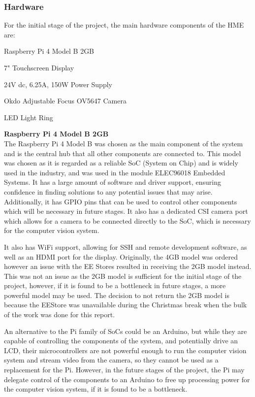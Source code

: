 \subsubsection{Hardware} \label{sec:hardware}
For the initial stage of the project, the main hardware components of the HME are:
\begin{mylist}
  \item Raspberry Pi 4 Model B 2GB\cite{pi4}
  \item 7" Touchscreen Display\cite{7inchdisplay}
  \item 24V dc, 6.25A, 150W Power Supply
  \item Okdo Adjustable Focus OV5647 Camera\cite{okdocamera}
  \item LED Light Ring
\end{mylist}
\textbf{Raspberry Pi 4 Model B 2GB} \\
The Raspberry Pi 4 Model B was chosen as the main component of the system and is the central hub that all other components are connected to.
This model was chosen as it is regarded as a reliable SoC (System on Chip) and is widely used in the industry, and was used in the module ELEC96018 Embedded Systems.
It has a large amount of software and driver support, ensuring confidence in finding solutions to any potential issues that may arise. Additionally, 
it has GPIO pins that can be used to control other components which will be necessary in future stages. It also has a 
dedicated CSI camera port which allows for a camera to be connected directly to the SoC, which is necessary for the computer vision system.

It also has WiFi support, allowing for SSH and remote development software, as well as an HDMI port for the display.
Originally, the 4GB model was ordered however an issue with the EE Stores resulted in receiving the 2GB model instead.
This was not an issue as the 2GB model is sufficient for the initial stage of the project, however, if it is found to be a bottleneck
in future stages, a more powerful model may be used. The decision to not return the 2GB model is because the EEStore was 
unavailable during the Christmas break when the bulk of the work was done for this report.

An alternative to the Pi family of SoCs could be an Arduino, but while they are capable of controlling the components of the system,
and potentially drive an LCD, their microcontrollers are not powerful enough to run the computer vision system and stream video from the camera,
so they cannot be used as a replacement for the Pi. However, in the future stages of the project, the Pi may delegate control of the components to an Arduino
to free up processing power for the computer vision system, if it is found to be a bottleneck.

